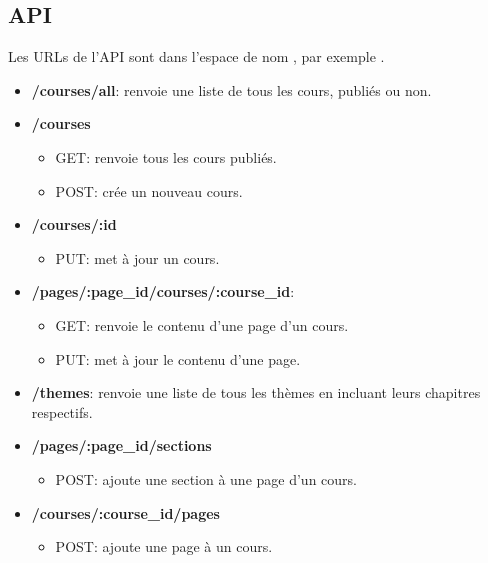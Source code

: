 \documentclass[a4paper,10pt,twoside]{sphinxmanual}
\begin{document}
\subsection{API}
\label{guide:api}
Les URLs de l'API sont dans l'espace de nom , par exemple .
\begin{itemize}
\item {} 
\textbf{/courses/all}: renvoie une liste de tous les cours, publiés ou non.

\item {} 
\textbf{/courses}
\begin{itemize}
\item {} 
GET: renvoie tous les cours publiés.

\item {} 
POST: crée un nouveau cours.

\end{itemize}

\item {} 
\textbf{/courses/:id}
\begin{itemize}
\item {} 
PUT: met à jour un cours.

\end{itemize}

\item {} 
\textbf{/pages/:page\_id/courses/:course\_id}:
\begin{itemize}
\item {} 
GET: renvoie le contenu d'une page d'un cours.

\item {} 
PUT: met à jour le contenu d'une page.

\end{itemize}

\item {} 
\textbf{/themes}: renvoie une liste de tous les thèmes en incluant leurs chapitres respectifs.

\item {} 
\textbf{/pages/:page\_id/sections}
\begin{itemize}
\item {} 
POST: ajoute une section à une page d'un cours.

\end{itemize}

\item {} 
\textbf{/courses/:course\_id/pages}
\begin{itemize}
\item {} 
POST: ajoute une page à un cours.


\end{itemize}
\end{itemize}
\end{document}
